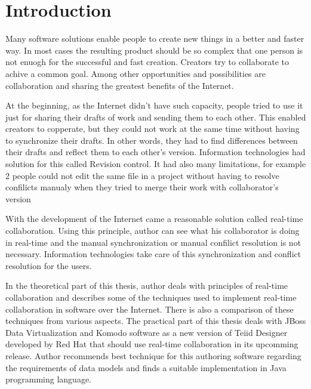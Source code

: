 \documentclass[12pt,oneside]{fithesis2}
\begin{document}
\FrontMatter
\ThesisTitlePage
\begin{ThesisDeclaration}
\DeclarationText
\AdvisorName
\end{ThesisDeclaration}
\begin{ThesisThanks}
\end{ThesisThanks}
\begin{ThesisAbstract}
\end{ThesisAbstract}
\begin{ThesisKeyWords}
\end{ThesisKeyWords}
\tableofcontents 
\MainMatter
\chapter{Introduction} 
Many software solutions enable people to create new things in a better and faster way. In most cases the resulting product should be so complex that one person is not enuogh for the successful and fast creation. Creators try to collaborate to achive a common goal. Among other opportunities and possibilities are collaboration and sharing the greatest benefits of the Internet. \par
At the beginning, as the Internet didn't have such capacity, people tried to use it just for sharing their drafts of work and sending them to each other. This enabled creators to copperate, but they could not work at the same time without having to synchronize their drafts. In other words, they had to find differences between their drafts and reflect them to each other's version. Information technologies had solution for this called Revision control. It had also many limitations, for example 2 people could not edit the same file in a project without having to resolve confilicts manualy when they tried to merge their work with collaborator's version\par
With the development of the Internet came a reasonable solution called real-time collaboration. Using this principle, author can see what his collaborator is doing in real-time and the manual synchronization or manual confilict resolution is not necessary. Information technologies take care of this synchronization and conflict resolution for the users.\par
In the theoretical part of this thesis, author deals with principles of real-time collaboration and describes some of the techniques used to implement real-time collaboration in software over the Internet. There is also a comparison of these techniques from various aspects. The practical part of this thesis deals with JBoss Data Virtualization and Komodo software as a new version of Teiid Designer developed by Red Hat that should use real-time collaboration in its upcomming release. Author recommends best technique for this authoring software regarding the requirements of data models and finds a suitable implementation in Java programming language.
\end{document}
